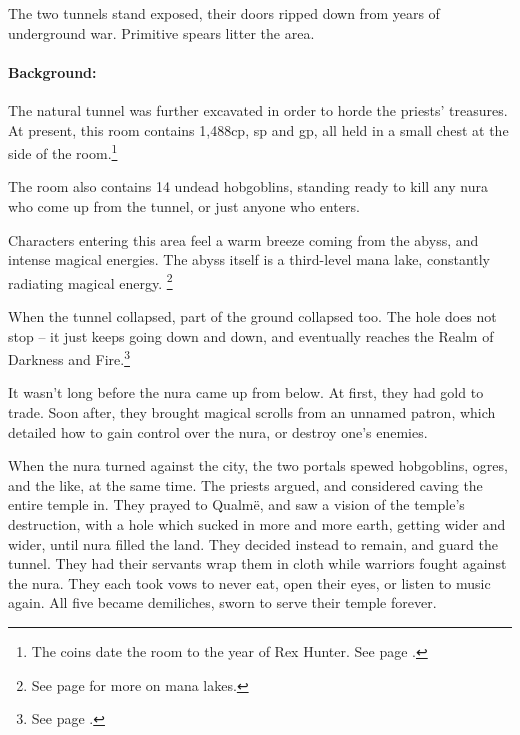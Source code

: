 \begin{multicols}{2}
The two tunnels stand exposed, their doors ripped down from years of underground war.
Primitive spears litter the area.


\paragraph{Background:}
The natural tunnel was further excavated in order to horde the priests' treasures.
At present, this room contains 1,488cp, \thepage sp and  gp, all held in a small chest at the side of the room.\footnote{The coins date the room to the year of Rex Hunter.
See page \pageref{r_hunter}.}

The room also contains 14 undead hobgoblins, standing ready to kill any nura who come up from the tunnel, or just anyone who enters.



Characters entering this area feel a warm breeze coming from the abyss, and intense magical energies.
The abyss itself is a third-level mana lake, constantly radiating magical energy.%
\footnote{See page \pageref{mana_lake} for more on mana lakes.}

\begin{exampletext}

When the tunnel collapsed, part of the ground collapsed too.
The hole does not stop -- it just keeps going down and down, and eventually reaches the Realm of Darkness and Fire.\footnote{See page \pageref{darknessandfire}.}

It wasn't long before the nura came up from below.
At first, they had gold to trade.
Soon after, they brought magical scrolls from an unnamed patron, which detailed how to gain control over the nura, or destroy one's enemies.

When the nura turned against the city, the two portals spewed hobgoblins, ogres, and the like, at the same time.
The priests argued, and considered caving the entire temple in.
They prayed to Qualm\"{e}, and saw a vision of the temple's destruction, with a hole which sucked in more and more earth, getting wider and wider, until nura filled the land.
They decided instead to remain, and guard the tunnel.
They had their servants wrap them in cloth while warriors fought against the nura.
They each took vows to never eat, open their eyes, or listen to music again.
All five became demiliches, sworn to serve their temple forever.


\end{exampletext}
\end{multicols}
